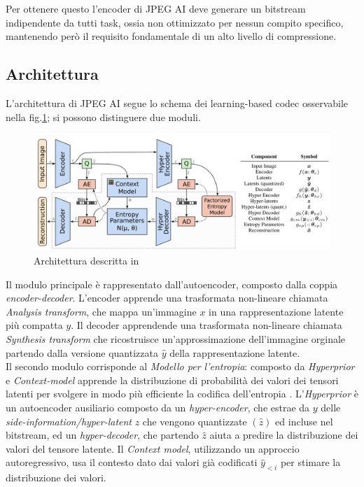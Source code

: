 Per ottenere questo l'encoder di JPEG AI deve generare un bitstream indipendente da tutti task, ossia non ottimizzato per nessun compito specifico, mantenendo però il requisito fondamentale di un alto livello di compressione.
\subsection{Architettura}\label{sec:architetturaJPEGAI}
L'architettura di JPEG AI segue lo schema dei learning-based codec \cite{minnen2018joint} osservabile nella fig.\ref{fig:architmin}; si possono distinguere due moduli.
\begin{figure}
    \centering
    \includegraphics[width=1\linewidth]{img/architetturaJPEGAI.png}
    \caption{Architettura descritta in \cite{minnen2018joint}}
    \label{fig:architmin}
\end{figure}
Il modulo principale è rappresentato dall'autoencoder, composto dalla coppia \textit{encoder-decoder}. L'encoder apprende una trasformata non-lineare chiamata \textit{Analysis transform}, che mappa un'immagine $x$ in una rappresentazione latente più compatta $y$. Il decoder apprendende una trasformata non-lineare chiamata \textit{Synthesis transform} che ricostruisce un'approssimazione dell'immagine orginale partendo dalla versione quantizzata $\hat{y}$ della rappresentazione latente.\\
Il secondo modulo corrisponde al \textit{Modello per l'entropia}: composto da \textit{Hyperprior} e \textit{Context-model} apprende la distribuzione di probabilità dei valori dei tensori latenti per svolgere in modo più efficiente la codifica dell'entropia \cite{balle2018variational}. L'\textit{Hyperprior} è un autoencoder ausiliario composto da un \textit{hyper-encoder}, che estrae da $y$ delle \textit{side-information/hyper-latent} $z$ che vengono quantizzate ${(\hat{z})}$ ed incluse nel bitstream, ed un \textit{hyper-decoder}, che partendo $\hat{z}$ aiuta a predire la distribuzione dei valori del tensore latente. Il \textit{Context model}, utilizzando un approccio autoregressivo, usa il contesto dato dai valori già codificati $\hat{y}_{<i}$ per stimare la distribuzione dei valori.\\
